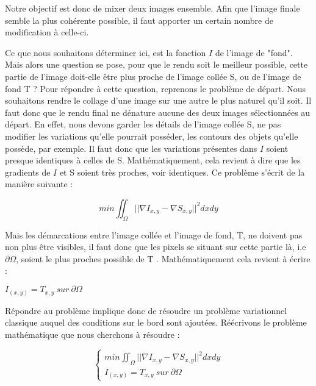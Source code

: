 \documentclass[10pt,a4paper]{article}
\begin{document}
Notre objectif est donc de mixer deux images ensemble.  
Afin que l'image finale semble la plus cohérente possible, il faut apporter un certain nombre de modification à celle-ci. 

Ce que nous souhaitons déterminer ici, est la fonction $I$ de l'image de "fond". Mais alors une question se pose, pour que le rendu soit le meilleur possible, cette partie de l'image doit-elle être plus proche de l'image collée S, ou de l'image de fond T ? 
Pour répondre à cette question, reprenons le problème de départ. 
Nous souhaitons rendre le collage d'une image sur une autre le plus naturel qu'il soit. Il faut donc que le rendu final ne dénature aucune des deux images sélectionnées au départ. En effet, nous devons garder les détails de l'image collée S, ne pas modifier les variations qu'elle pourrait posséder, les contours des objets qu'elle possède, par exemple. Il faut donc que les variations présentes dans $I$ soient presque identiques à celles de S. Mathématiquement, cela revient à dire que les gradients de $I$ et S soient très proches, voir identiques. Ce problème s'écrit de la manière suivante :
\begin{center}
    $$ min \iint_\Omega || \nabla I_{x,y} - \nabla S_{x,y}||^2 dxdy$$
\end{center} 

Mais les démarcations entre l'image collée  et l'image de fond, T, ne doivent pas non plus être visibles, il faut donc que les pixels se situant sur cette partie là, i.e $\partial \Omega$, soient le plus proches possible de T .  Mathématiquement cela revient à écrire : 
\begin{center}
    $I_{(x,y)} = T_{x,y} \ sur\ \partial \Omega$
\end{center}

Répondre au problème implique donc de résoudre un problème variationnel classique auquel des conditions sur le bord sont ajoutées. 
Réécrivons le problème mathématique que nous cherchons à résoudre :  

\begin{center}
\begin{equation*}
\left\{
\begin{aligned}
 min \iint_\Omega || \nabla I_{x,y} - \nabla S_{x,y}||^2 dxdy\\
 I_{(x,y)} = T_{x,y} \ sur\ \partial \Omega
\end{aligned}
\right.
\end{equation*}
\end{center}
\end{document}
